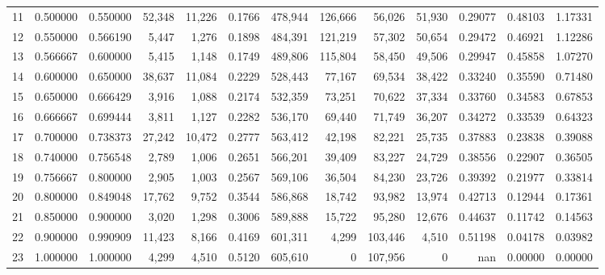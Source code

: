\begin{tabular}{rrrrrrrrrrrrr}
11 &  0.500000 &  0.550000 &  52,348 &  11,226 &                                     0.1766 &  478,944 &  126,666 &   56,026 &   51,930 &  0.29077 &  0.48103 &  1.17331 \\
12 &  0.550000 &  0.566190 &   5,447 &   1,276 &                                     0.1898 &  484,391 &  121,219 &   57,302 &   50,654 &  0.29472 &  0.46921 &  1.12286 \\
13 &  0.566667 &  0.600000 &   5,415 &   1,148 &                                     0.1749 &  489,806 &  115,804 &   58,450 &   49,506 &  0.29947 &  0.45858 &  1.07270 \\
14 &  0.600000 &  0.650000 &  38,637 &  11,084 &                                     0.2229 &  528,443 &   77,167 &   69,534 &   38,422 &  0.33240 &  0.35590 &  0.71480 \\
15 &  0.650000 &  0.666429 &   3,916 &   1,088 &                                     0.2174 &  532,359 &   73,251 &   70,622 &   37,334 &  0.33760 &  0.34583 &  0.67853 \\
16 &  0.666667 &  0.699444 &   3,811 &   1,127 &                                     0.2282 &  536,170 &   69,440 &   71,749 &   36,207 &  0.34272 &  0.33539 &  0.64323 \\
17 &  0.700000 &  0.738373 &  27,242 &  10,472 &                                     0.2777 &  563,412 &   42,198 &   82,221 &   25,735 &  0.37883 &  0.23838 &  0.39088 \\
18 &  0.740000 &  0.756548 &   2,789 &   1,006 &                                     0.2651 &  566,201 &   39,409 &   83,227 &   24,729 &  0.38556 &  0.22907 &  0.36505 \\
19 &  0.756667 &  0.800000 &   2,905 &   1,003 &                                     0.2567 &  569,106 &   36,504 &   84,230 &   23,726 &  0.39392 &  0.21977 &  0.33814 \\
20 &  0.800000 &  0.849048 &  17,762 &   9,752 &                                     0.3544 &  586,868 &   18,742 &   93,982 &   13,974 &  0.42713 &  0.12944 &  0.17361 \\
21 &  0.850000 &  0.900000 &   3,020 &   1,298 &                                     0.3006 &  589,888 &   15,722 &   95,280 &   12,676 &  0.44637 &  0.11742 &  0.14563 \\
22 &  0.900000 &  0.990909 &  11,423 &   8,166 &                                     0.4169 &  601,311 &    4,299 &  103,446 &    4,510 &  0.51198 &  0.04178 &  0.03982 \\
23 &  1.000000 &  1.000000 &   4,299 &   4,510 &                                     0.5120 &  605,610 &        0 &  107,956 &        0 &      nan &  0.00000 &  0.00000 \\
\bottomrule
\end{tabular}
